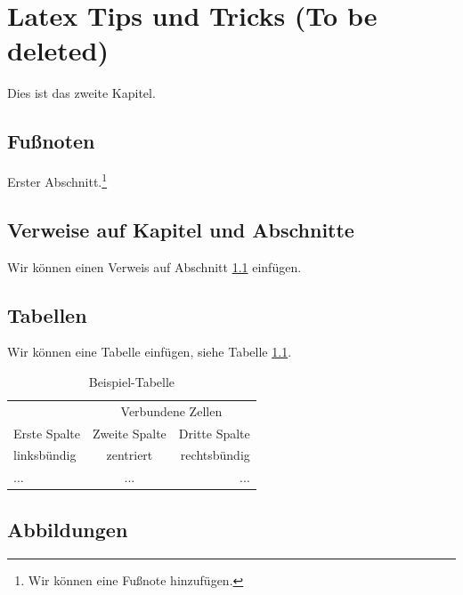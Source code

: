 \chapter{Latex Tips und Tricks (To be deleted)}


Dies ist das zweite Kapitel.


\section{Fußnoten}
\label{sec:fussnoten}                 %


Erster Abschnitt.\footnote{Wir können eine Fußnote hinzufügen.} 



\section{Verweise auf Kapitel und Abschnitte}


Wir können einen Verweis auf Abschnitt \ref{sec:fussnoten} einfügen.



\section{Tabellen}


Wir können eine Tabelle einfügen, siehe Tabelle \ref{tab:beispieltab}.



\begin{table}[hbt]
\centering
\begin{tabular}{lcr}
\toprule
                 & \multicolumn{2}{c}{Verbundene Zellen} \\
\cmidrule{2-3}
   Erste Spalte  & Zweite Spalte  & Dritte Spalte \\
\midrule
   linksbündig   & zentriert      & rechtsbündig  \\
   ...           & ...            & ...           \\
\bottomrule
\end{tabular}
\caption{Beispiel-Tabelle}
\label{tab:beispieltab}
\end{table}



\section{Abbildungen}


